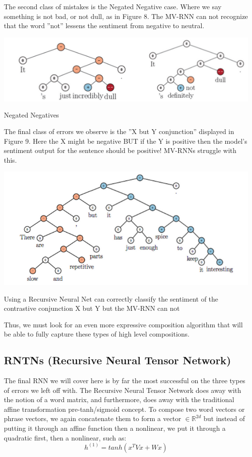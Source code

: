 \documentclass{tufte-handout}
\begin{document}
The second class of mistakes is the Negated Negative case. Where we say something is not bad, or not dull, as in Figure 8. The MV-RNN can not recognize that the word ''not'' lessens the sentiment from negative to neutral.


\begin{marginfigure}%
  \includegraphics[width=\linewidth]{img8}
  \caption{Negated Negatives}
  \label{fig:img8}
\end{marginfigure}

The final class of errors we observe is the ''X but Y conjunction'' displayed in Figure 9. Here the X might be negative BUT if the Y is positive then the model's sentiment output for the sentence should be positive! MV-RNNs struggle with this.

\begin{marginfigure}%
  \includegraphics[width=\linewidth]{img9}
  \caption{Using a Recursive Neural Net can correctly classify the sentiment of the contrastive conjunction X but Y but the MV-RNN can not}
  \label{fig:img9}
\end{marginfigure}

Thus, we must look for an even more expressive composition algorithm that will be able to fully capture these types of high level compositions.

\subsection{RNTNs (Recursive Neural Tensor Network)}

The final RNN we will cover here is by far the most successful on the three types of errors we left off with. The Recursive Neural Tensor Network does away with the notion of a word matrix, and furthermore, does away with the traditional affine transformation pre-tanh/sigmoid concept. To compose two word vectors or phrase vectors, we again concatenate them to form a vector $\in \mathbb{R}^{2d}$ but instead of putting it through an affine function then a nonlinear, we put it through a quadratic first, then a nonlinear, such as: 
\begin{equation}
h^{(1)} = tanh(x^T V x + Wx)
\end{equation}
\end{document}
